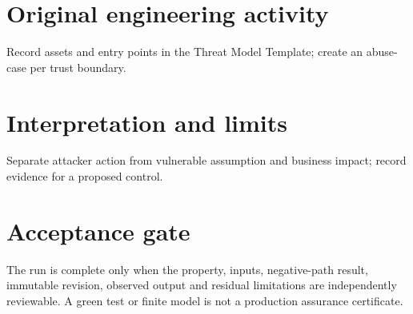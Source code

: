 \documentclass[10pt,letterpaper]{article}
\begin{document}
\section{Original engineering activity}
Record assets and entry points in the Threat Model Template; create an abuse-case per trust boundary.
\section{Interpretation and limits}
Separate attacker action from vulnerable assumption and business impact; record evidence for a proposed control.
\section{Acceptance gate}
The run is complete only when the property, inputs, negative-path result, immutable revision, observed output and residual limitations are independently reviewable. A green test or finite model is not a production assurance certificate.
\end{document}
